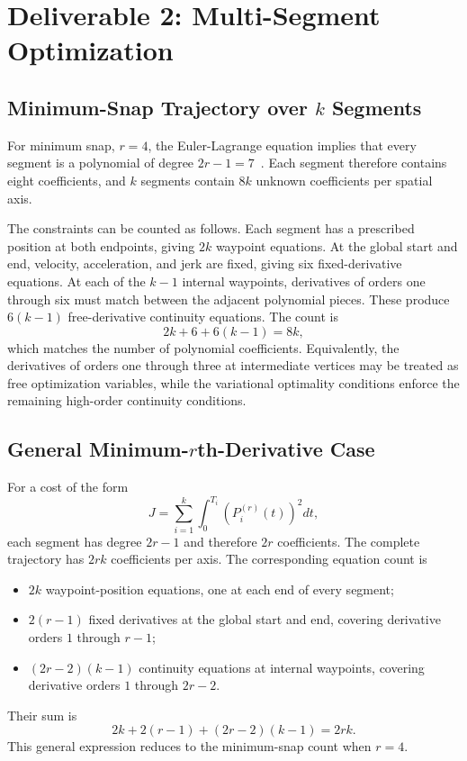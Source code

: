 \documentclass[letterpaper,10pt,conference]{IEEEtran}
\begin{document}
\section{Deliverable 2: Multi-Segment Optimization}
\subsection{Minimum-Snap Trajectory over $k$ Segments}
For minimum snap, $r=4$, the Euler-Lagrange equation implies that every segment is a polynomial of degree $2r-1=7$~\cite{mittrajnotes}. Each segment therefore contains eight coefficients, and $k$ segments contain $8k$ unknown coefficients per spatial axis.

The constraints can be counted as follows. Each segment has a prescribed position at both endpoints, giving $2k$ waypoint equations. At the global start and end, velocity, acceleration, and jerk are fixed, giving six fixed-derivative equations. At each of the $k-1$ internal waypoints, derivatives of orders one through six must match between the adjacent polynomial pieces. These produce $6(k-1)$ free-derivative continuity equations. The count is
\begin{equation}
2k+6+6(k-1)=8k,
\end{equation}
which matches the number of polynomial coefficients. Equivalently, the derivatives of orders one through three at intermediate vertices may be treated as free optimization variables, while the variational optimality conditions enforce the remaining high-order continuity conditions.

\subsection{General Minimum-$r$th-Derivative Case}
For a cost of the form
\begin{equation}
J=\sum_{i=1}^{k}\int_0^{T_i}\left(P_i^{(r)}(t)\right)^2dt,
\end{equation}
each segment has degree $2r-1$ and therefore $2r$ coefficients. The complete trajectory has $2rk$ coefficients per axis. The corresponding equation count is
\begin{itemize}
\item $2k$ waypoint-position equations, one at each end of every segment;
\item $2(r-1)$ fixed derivatives at the global start and end, covering derivative orders $1$ through $r-1$;
\item $(2r-2)(k-1)$ continuity equations at internal waypoints, covering derivative orders $1$ through $2r-2$.
\end{itemize}
Their sum is
\begin{equation}
2k+2(r-1)+(2r-2)(k-1)=2rk.
\end{equation}
This general expression reduces to the minimum-snap count when $r=4$.
\end{document}
